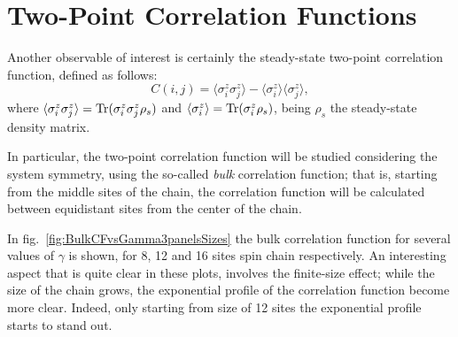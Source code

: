 



\section{Two-Point Correlation Functions}
Another observable of interest is certainly the steady-state two-point correlation function, defined as follows:
\begin{equation}
    C(i, j) = \langle \sigma^z_i \sigma^z_j \rangle - \langle \sigma^z_i \rangle \langle \sigma^z_j \rangle,
\end{equation}
where $\langle \sigma^z_i \sigma^z_j \rangle = \operatorname{Tr}(\sigma^z_i \sigma^z_j \rho_{s})$ and $\langle \sigma^z_i \rangle = \operatorname{Tr}(\sigma^z_i \rho_{s})$, being $\rho_{s}$ the steady-state density matrix.

In particular, the two-point correlation function will be studied considering the system symmetry, using the so-called \emph{bulk} correlation function; that is, starting from the middle sites of the chain, the correlation function will be calculated between equidistant sites from the center of the chain. 

In fig.~\ref{fig:BulkCFvsGamma3panelsSizes} the bulk correlation function for several values of $\gamma$ is shown, for 8, 12 and 16 sites spin chain respectively. An interesting aspect that is quite clear in these plots, involves the finite-size effect; while the size of the chain grows, the exponential profile of the correlation function become more clear. Indeed, only starting from size of 12 sites the exponential profile starts to stand out. 

